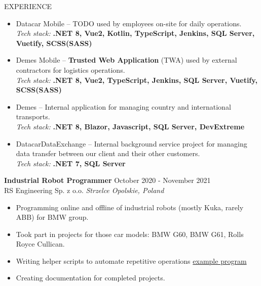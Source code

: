 \documentclass{resume}
\begin{document}
\begin{rSection}{EXPERIENCE}
\begin{itemize}[leftmargin=0.5cm]
\begin{itemize}
{        OpenID Connect + OAuth2.0 (Identity Provider 4)}
        \item Datacar Mobile – TODO used by employees on-site for daily operations. \\ [0.4em]
        \textit{Tech stack:} \textbf{.NET 8, Vue2, Kotlin, TypeScript, Jenkins, SQL Server, Vuetify, SCSS(SASS)}
        \item Demes Mobile – \textbf{Trusted Web Application} (TWA) used by external contractors for logistics operations. \\ [0.4em]
        \textit{Tech stack:} \textbf{.NET 8, Vue2, TypeScript, Jenkins, SQL Server, Vuetify, SCSS(SASS)}
        \item Demes – Internal application for managing country and international transports. \\ [0.4em]
        \textit{Tech stack:} \textbf{.NET 8, Blazor, Javascript, SQL Server, DevExtreme}
        \item DatacarDataExchange – Internal background service project for managing data transfer between our client and their other customers. \\ [0.4em]
        \textit{Tech stack:} \textbf{.NET 7, SQL Server}
    \end{itemize} 
\end{itemize}
\textbf{Industrial Robot Programmer} \hfill October 2020 - November 2021 \\ [0.4em]
RS Engineering Sp. z o.o. \hfill \textit{Strzelce Opolskie, Poland}
\begin{itemize}[leftmargin=0.5cm]
\itemsep-3pt {}
    \item Programming online and offline of industrial robots (mostly Kuka, rarely ABB) for BMW group. 
    \item Took part in projects for those car models: BMW G60, BMW G61, Rolls Royce Cullican.
    \item Writing helper scripts to automate repetitive operations \href{https://github.com/RoobyJ/KukaGo}{example program}
    \item Creating documentation for completed projects.
\end{itemize}
\end{rSection}
\end{document}
